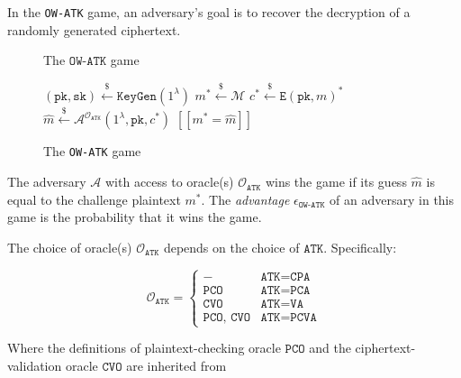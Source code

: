 \documentclass[floatrow,journal=tches,submission]{iacrtrans}
\newcommand{\monospace}{\texttt}
\newcommand{\keygen}{\monospace{KeyGen}}
\newcommand{\encrypt}{\monospace{E}}
\newcommand{\pk}{\monospace{pk}}
\newcommand{\sk}{\monospace{sk}}
\newcommand{\leftsample}{\stackrel{\$}{\leftarrow}}
\newcommand{\llbrack}{[\![}
\newcommand{\rrbrack}{]\!]}
\begin{document}
In the \monospace{OW-ATK} game, an adversary's goal is to recover the decryption of a randomly generated ciphertext.

\begin{figure}
    \centering

    \begin{algorithm}[H]
        \caption{
            The $\monospace{OW-ATK}$ game
        }\label{alg:pke-ow-atk-game}
        \begin{algorithmic}[1]
            \State $(\pk, \sk) \leftsample \keygen(1^\lambda)$
            \State $m^\ast \leftsample \mathcal{M}$
            \State $c^\ast \leftsample \encrypt(\pk, m)^\ast$
            \State $\hat{m} \leftsample \mathcal{A}^{\mathcal{O}_\monospace{ATK}}(1^\lambda, \pk, c^\ast)$
            \State \Return $\llbrack m^\ast = \hat{m} \rrbrack$
        \end{algorithmic}
    \end{algorithm}
    
    \caption{The \monospace{OW-ATK} game}
    \label{fig:pke-ow-atk-game}
\end{figure}

The adversary $\mathcal{A}$ with access to oracle(s) $\mathcal{O}_\monospace{ATK}$ wins the game if its guess $\hat{m}$ is equal to the challenge plaintext $m^\ast$. The \textit{advantage} $\epsilon_\monospace{OW-ATK}$ of an adversary in this game is the probability that it wins the game.

The choice of oracle(s) $\mathcal{O}_\monospace{ATK}$ depends on the choice of $\monospace{ATK}$. Specifically:

\begin{equation*}
    \mathcal{O}_\monospace{ATK} = \begin{cases}
        - & \monospace{ATK} = \monospace{CPA} \\
        \monospace{PCO} & \monospace{ATK} = \monospace{PCA} \\
        \monospace{CVO} & \monospace{ATK} = \monospace{VA} \\
        \monospace{PCO, CVO} & \monospace{ATK} = \monospace{PCVA}
    \end{cases}
\end{equation*}

Where the definitions of plaintext-checking oracle $\monospace{PCO}$ and the ciphertext-validation oracle $\monospace{CVO}$ are inherited from \cite{hofheinz2017modular}
\end{document}
